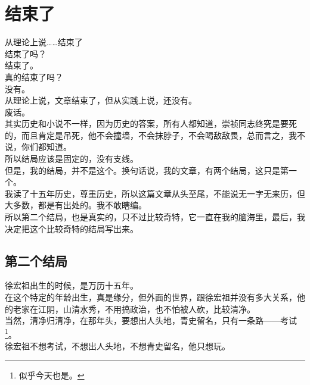 \section{结束了}
\ifnum{}
	\begin{multicols}{\theparacolNo}
\fi
从理论上说……结束了\\

结束了吗？\\

结束了。\\

真的结束了吗？\\

没有。\\

从理论上说，文章结束了，但从实践上说，还没有。\\

废话。\\

其实历史和小说不一样，因为历史的答案，所有人都知道，崇祯同志终究是要死的，而且肯定是吊死，他不会撞墙，不会抹脖子，不会喝敌敌畏，总而言之，我不说，你们都知道。\\

所以结局应该是固定的，没有支线。\\

但是，我的结局，并不是这个。换句话说，我的文章，有两个结局，这只是第一个。\\

我读了十五年历史，尊重历史，所以这篇文章从头至尾，不能说无一字无来历，但大多数，都是有出处的。我不敢瞎编。\\

所以第二个结局，也是真实的，只不过比较奇特，它一直在我的脑海里，最后，我决定把这个比较奇特的结局写出来。\\

\subsection{第二个结局}
徐宏祖出生的时候，是万历十五年。\\

在这个特定的年龄出生，真是缘分，但外面的世界，跟徐宏祖并没有多大关系，他的老家在江阴，山清水秀，不用搞政治，也不怕被人砍，比较清净。\\

当然，清净归清净，在那年头，要想出人头地，青史留名，只有一条路——考试\footnote{似乎今天也是。}。\\

徐宏祖不想考试，不想出人头地，不想青史留名，他只想玩。\\


\end{multicols}
